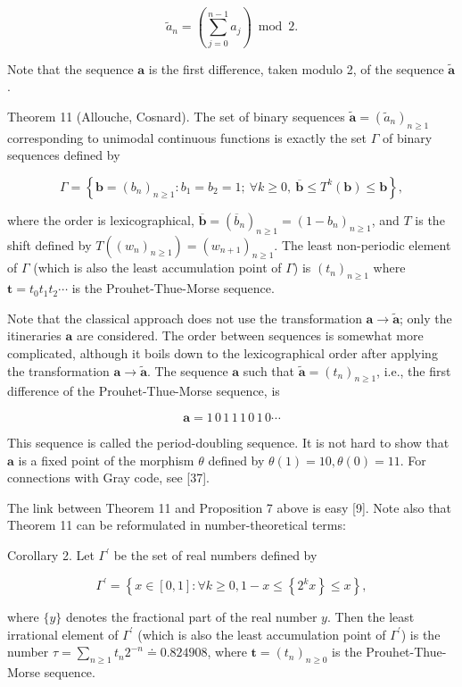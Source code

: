 \documentclass[10pt]{article}
\begin{document}
\[
\widetilde a_n=\left(\sum_{j=0}^{n-1}a_j\right)\bmod 2.
\]

Note that the sequence $\mathbf{a}$ is the first difference, taken modulo 2, of the sequence $\widetilde{\mathbf{a}}$.

Theorem 11 (Allouche, Cosnard). The set of binary sequences $\widetilde{\mathbf{a}}=(\widetilde a_n)_{n\geq 1}$ corresponding to unimodal continuous functions is exactly the set $\Gamma$ of binary sequences defined by

\[
\Gamma=\left\{\mathbf{b}=(b_n)_{n\geq 1}: b_1=b_2=1;\ \forall k\geq 0,\ \overline{\mathbf{b}}\leq T^k(\mathbf{b})\leq\mathbf{b}\right\},
\]

where the order is lexicographical, $\overline{\mathbf{b}}=(\overline b_n)_{n\geq 1}=(1-b_n)_{n\geq 1}$, and $T$ is the shift defined by $T((w_n)_{n\geq 1})=(w_{n+1})_{n\geq 1}$. The least non-periodic element of $\Gamma$ (which is also the least accumulation point of $\Gamma$) is $\left(t_{n}\right)_{n \geq 1}$ where $\mathbf{t}=t_{0} t_{1} t_{2} \cdots$ is the Prouhet-Thue-Morse sequence.

Note that the classical approach does not use the transformation $\mathbf{a} \rightarrow \widetilde{\mathbf{a}}$; only the itineraries $\mathbf{a}$ are considered. The order between sequences is somewhat more complicated, although it boils down to the lexicographical order after applying the transformation $\mathbf{a} \rightarrow \widetilde{\mathbf{a}}$. The sequence $\mathbf{a}$ such that $\widetilde{\mathbf{a}}=\left(t_{n}\right)_{n \geq 1}$, i.e., the first difference of the Prouhet-Thue-Morse sequence, is

\[
\mathbf{a}=1\,0\,1\,1\,1\,0\,1\,0\cdots
\]

This sequence is called the period-doubling sequence. It is not hard to show that $\mathbf{a}$ is a fixed point of the morphism $\theta$ defined by $\theta(1)=10, \theta(0)=11$. For connections with Gray code, see [37].

The link between Theorem 11 and Proposition 7 above is easy [9]. Note also that Theorem 11 can be reformulated in number-theoretical terms:

Corollary 2. Let $\Gamma^{\prime}$ be the set of real numbers defined by

\[
\Gamma^{\prime}=\left\{x \in[0,1]: \forall k \geq 0,1-x \leq\left\{2^{k} x\right\} \leq x\right\},
\]

where $\{y\}$ denotes the fractional part of the real number $y$. Then the least irrational element of $\Gamma^{\prime}$ (which is also the least accumulation point of $\Gamma^{\prime}$) is the number $\tau=\sum_{n \geq 1} t_{n} 2^{-n} \doteq 0.824908$, where $\mathbf{t}=\left(t_{n}\right)_{n \geq 0}$ is the Prouhet-Thue-Morse sequence.
\end{document}
